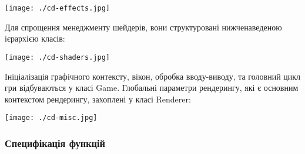 \begin{center}
  \texttt{[image: ./cd-effects.jpg]}
\end{center}

Для спрощення менеджменту шейдерів, вони структуровані нижченаведеною ієрархією класів:

\begin{center}
  \texttt{[image: ./cd-shaders.jpg]}
\end{center}

Ініціалізація графічного контексту, вікон, обробка вводу-виводу, та головний цикл гри відбуваються у класі Game. Глобальні параметри рендерингу, які є основним контекстом рендерингу, захоплені у класі Renderer:

\begin{center}
  \texttt{[image: ./cd-misc.jpg]}
\end{center}

\subsubsection{Специфікація функцій}

